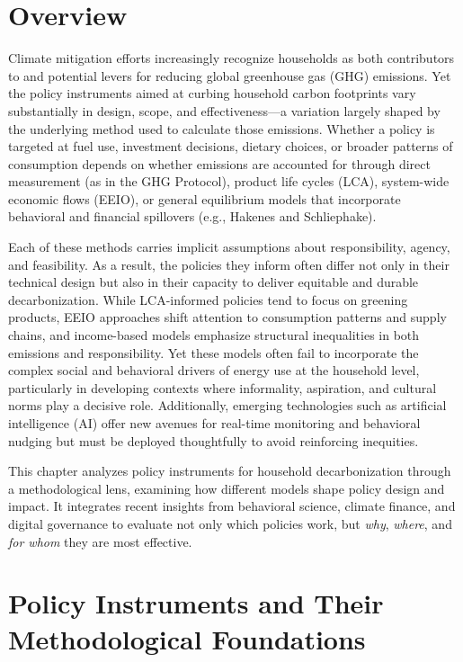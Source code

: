 \documentclass[12pt,a4paper]{article}%
\begin{document}
\section{Overview}

Climate mitigation efforts increasingly recognize households as both contributors to and potential levers for reducing global greenhouse gas (GHG) emissions. Yet the policy instruments aimed at curbing household carbon footprints vary substantially in design, scope, and effectiveness—a variation largely shaped by the underlying method used to calculate those emissions. Whether a policy is targeted at fuel use, investment decisions, dietary choices, or broader patterns of consumption depends on whether emissions are accounted for through direct measurement (as in the GHG Protocol), product life cycles (LCA), system-wide economic flows (EEIO), or general equilibrium models that incorporate behavioral and financial spillovers (e.g., Hakenes and Schliephake).

Each of these methods carries implicit assumptions about responsibility, agency, and feasibility. As a result, the policies they inform often differ not only in their technical design but also in their capacity to deliver equitable and durable decarbonization. While LCA-informed policies tend to focus on greening products, EEIO approaches shift attention to consumption patterns and supply chains, and income-based models emphasize structural inequalities in both emissions and responsibility. Yet these models often fail to incorporate the complex social and behavioral drivers of energy use at the household level, particularly in developing contexts where informality, aspiration, and cultural norms play a decisive role. Additionally, emerging technologies such as artificial intelligence (AI) offer new avenues for real-time monitoring and behavioral nudging but must be deployed thoughtfully to avoid reinforcing inequities.

This chapter analyzes policy instruments for household decarbonization through a methodological lens, examining how different models shape policy design and impact. It integrates recent insights from behavioral science, climate finance, and digital governance to evaluate not only which policies work, but \emph{why}, \emph{where}, and \emph{for whom} they are most effective.

\section{Policy Instruments and Their Methodological Foundations}
\end{document}
